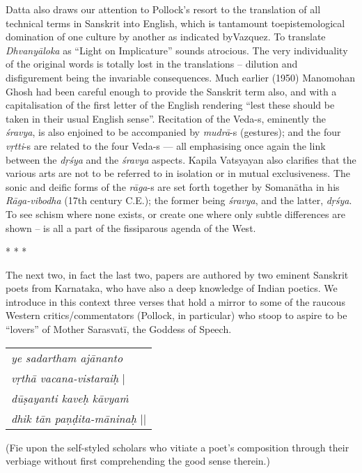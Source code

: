 Datta also draws our attention to Pollock’s resort to the translation of all technical terms in Sanskrit into English, which is tantamount to\break epistemological domination of one culture by another as indicated by\break Vazquez. To translate \textsl{Dhvanyāloka} as “Light on Implicature” sounds atrocious. The very individuality of the original words is totally lost in the translations -- dilution and disfigurement being the invariable consequences. Much earlier (1950) Manomohan Ghosh had been careful enough to provide the Sanskrit term also, and with a capitalisation of the first letter of the English rendering “lest these should be taken in their usual English sense”. Recitation of the \hbox{Veda-s}, eminently the \textsl{śravya}, is also enjoined to be accompanied by \hbox{\textsl{mudrā}-s} (gestures); and the four \textsl{vṛtti}-s are related to the four Veda-s --- all emphasising once again the link between the \textsl{dṛśya} and the \textsl{śravya} aspects. Kapila Vatsyayan also clarifies that the various arts are not to be referred to in isolation or in mutual exclusiveness. The sonic and deific forms of the \textsl{rāga}-s are set forth together by Somanātha in his \textsl{Rāga-vibodha} (17th century C.E.); the former being \textsl{śravya}, and the latter, \textsl{dṛśya}. To see schism where none exists, or create one where only subtle differences are shown -- is all a part of the fissiparous agenda of the West.

\begin{center}
* * *
\end{center}

The next two, in fact the last two, papers are authored by two eminent Sanskrit poets from Karnataka, who have also a deep knowledge of Indian poetics. We introduce in this context three verses that hold a mirror to some of the raucous Western critics/commentators (Pollock, in particular) who stoop to aspire to be ``lovers'' of Mother Sarasvatī, the Goddess of Speech.
\begin{center}
\begin{tabular}{l}
\textsl{ye sadartham ajānanto}\\
\phantom{aaaaaa}\textsl{vṛthā vacana-vistaraiḥ} |\\
\textsl{dūṣayanti kaveḥ kāvyaṁ}\\
\phantom{aaaaaa}\textsl{dhik tān paṇḍita-māninaḥ} ||
\end{tabular}
\end{center}
(Fie upon the self-styled scholars who vitiate a poet's composition through their verbiage without first comprehending the good sense therein.)

